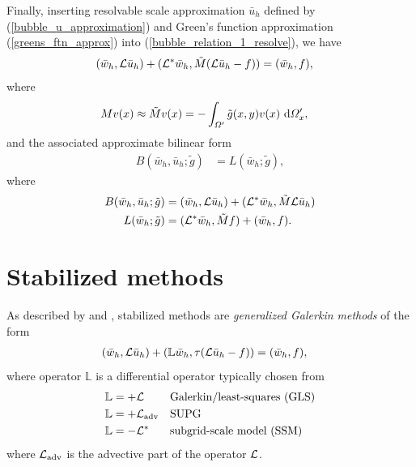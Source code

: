 Finally, inserting resolvable scale approximation $\bar{u}_h$ defined by (\ref{bubble_u_approximation}) and Green's function approximation (\ref{greens_ftn_approx}) into (\ref{bubble_relation_1_resolve}), we have
\begin{align}
  \label{bubble_relation_1_resolve_approx}
  (\bar{w}_h, \mathcal{L} \bar{u}_h) + (\mathcal{L}^* \bar{w}_h, \tilde{M}(\mathcal{L}\bar{u}_h - f)) &= (\bar{w}_h, f),
\end{align}
where
\begin{align*}
  M v(x) \approx \tilde{M} v(x) &= - \int_{\varOmega'} \tilde{g}(x,y) v(x) \ \mathrm{d}\varOmega_x',
\end{align*}
and the associated approximate bilinear form
\begin{align*}
  B(\bar{w}_h, \bar{u}_h; \tilde{g}) &= L(\bar{w}_h; \tilde{g}),
\end{align*}
where
\begin{align*}
  B(\bar{w}_h, \bar{u}_h; \tilde{g}) &= (\bar{w}_h, \mathcal{L} \bar{u}_h) + (\mathcal{L}^* \bar{w}_h, \tilde{M} \mathcal{L}\bar{u}_h) \\
  L(\bar{w}_h; \tilde{g}) &= (\mathcal{L}^* \bar{w}_h, \tilde{M}f) + (\bar{w}_h, f).
\end{align*}


\section{Stabilized methods} \label{ssn_stabilized_methods}

As described by \citet{hughes_1995} and \citet{codina_1992}, stabilized methods are \emph{generalized Galerkin methods} of the form
\begin{align}
  \label{generalized_form}
  (\bar{w}_h, \mathcal{L} \bar{u}_h) + (\mathbb{L} \bar{w}_h, \tau(\mathcal{L}\bar{u}_h - f)) &= (\bar{w}_h, f),
\end{align}
where operator $\mathbb{L}$ is a differential operator typically chosen from
\begin{align}
  \label{bubble_gls_operator}
  \mathbb{L} &= + \mathcal{L} && \text{Galerkin/least-squares (GLS)} \\
  \label{bubble_supg_operator}
  \mathbb{L} &= + \mathcal{L}_{\text{adv}} && \text{SUPG} \\
  \label{bubble_ssm_operator}
  \mathbb{L} &= - \mathcal{L}^* && \text{subgrid-scale model (SSM)}
\end{align}
where $\mathcal{L}_{\text{adv}}$ is the advective part of the operator $\mathcal{L}$.

